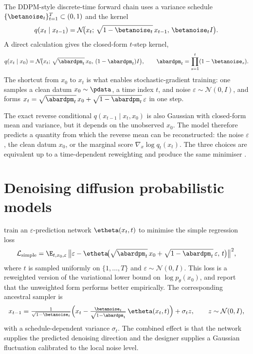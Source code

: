 The DDPM-style discrete-time forward chain uses a variance schedule
$\{\betanoise_t\}_{t=1}^{T}\subset(0,1)$ and the kernel
\[
  q(x_t \mid x_{t-1})
  = \mathcal{N}\!\big(x_t;\, \sqrt{1-\betanoise_t}\,x_{t-1},\, \betanoise_t I\big).
\]
A direct calculation gives the closed-form $t$-step kernel,
\[
  q(x_t \mid x_0)
  = \mathcal{N}\!\big(x_t;\, \sqrt{\abardpm_t}\,x_0,\, (1-\abardpm_t)I\big),
  \qquad
  \abardpm_t = \prod_{s=1}^{t}(1-\betanoise_s).
\]
The shortcut from $x_0$ to $x_t$ is what enables stochastic-gradient
training: one samples a clean datum $x_0\sim\pdata$, a time index $t$, and
noise $\varepsilon\sim\mathcal{N}(0,I)$, and forms
$x_t = \sqrt{\abardpm_t}\,x_0 + \sqrt{1-\abardpm_t}\,\varepsilon$ in one
step.

The exact reverse conditional $q(x_{t-1}\mid x_t,x_0)$ is also Gaussian with
closed-form mean and variance, but it depends on the unobserved $x_0$. The
model therefore predicts a quantity from which the reverse mean can be
reconstructed: the noise $\varepsilon$, the clean datum $x_0$, or the
marginal score $\nabla_{x}\log q_t(x_t)$. The three choices are equivalent
up to a time-dependent reweighting and produce the same minimiser
\parencite{ho2020ddpm,song2021score}.

\section{Denoising diffusion probabilistic models}
\label{lit:sec:ddpm}

\textcite{ho2020ddpm} train an $\varepsilon$-prediction network
$\etheta(x_t,t)$ to minimise the simple regression loss
\[
  \mathcal{L}_{\mathrm{simple}}
  = \E_{t,x_0,\varepsilon}\,
    \big\|\varepsilon
        - \etheta\!\big(\sqrt{\abardpm_t}\,x_0
                       + \sqrt{1-\abardpm_t}\,\varepsilon,\, t\big)\big\|^2,
\]
where $t$ is sampled uniformly on $\{1,\ldots,T\}$ and
$\varepsilon\sim\mathcal{N}(0,I)$. This loss is a reweighted version of
the variational lower bound on $\log p_\theta(x_0)$, and \textcite{ho2020ddpm}
report that the unweighted form performs better empirically. The
corresponding ancestral sampler is
\[
  x_{t-1}
  = \tfrac{1}{\sqrt{1-\betanoise_t}}\Big(x_t
       - \tfrac{\betanoise_t}{\sqrt{1-\abardpm_t}}\,\etheta(x_t,t)\Big)
    + \sigma_t z,
  \qquad z\sim\mathcal{N}(0,I),
\]
with a schedule-dependent variance $\sigma_t$. The combined effect is that
the network supplies the predicted denoising direction and the designer
supplies a Gaussian fluctuation calibrated to the local noise level.

